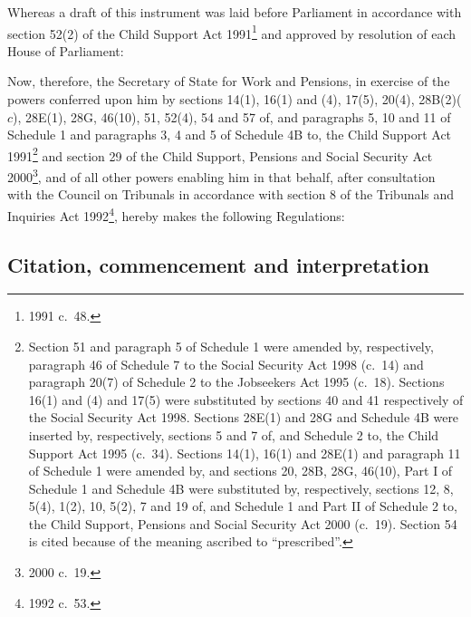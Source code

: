 \documentclass[12pt,a4paper]{article}
\title{\regstitle}
\author{S.I.\ 2002 No.\ 1204}
\date{Made
29th April 2002\\
Coming into force
in accordance with regulation 1(3)
}
\begin{document}
\maketitle

\noindent
Whereas a draft of this instrument was laid before Parliament in accordance with section 52(2) of the Child Support Act 1991\footnote{1991 c.\ 48.} and approved by resolution of each House of Parliament:

Now, therefore, the Secretary of State for Work and Pensions, in exercise of the powers conferred upon him by sections 14(1), 16(1) and (4), 17(5), 20(4), 28B(2)($c$), 28E(1), 28G, 46(10), 51, 52(4), 54 and 57 of, and paragraphs 5, 10 and 11 of Schedule 1 and paragraphs 3, 4 and 5 of Schedule 4B to, the Child Support Act 1991\footnote{Section 51 and paragraph 5 of Schedule 1 were amended by, respectively, paragraph 46 of Schedule 7 to the Social Security Act 1998 (c.\ 14) and paragraph 20(7) of Schedule 2 to the Jobseekers Act 1995 (c.\ 18). Sections 16(1) and (4) and 17(5) were substituted by sections 40 and 41 respectively of the Social Security Act 1998. Sections 28E(1) and 28G and Schedule 4B were inserted by, respectively, sections 5 and 7 of, and Schedule 2 to, the Child Support Act 1995 (c.\ 34). Sections 14(1), 16(1) and 28E(1) and paragraph 11 of Schedule 1 were amended by, and sections 20, 28B, 28G, 46(10), Part I of Schedule 1 and Schedule 4B were substituted by, respectively, sections 12, 8, 5(4), 1(2), 10, 5(2), 7 and 19 of, and Schedule 1 and Part II of Schedule 2 to, the Child Support, Pensions and Social Security Act 2000 (c.\ 19). Section 54 is cited because of the meaning ascribed to “prescribed”.} and section 29 of the Child Support, Pensions and Social Security Act 2000\footnote{2000 c.\ 19.}, and of all other powers enabling him in that behalf, after consultation with the Council on Tribunals in accordance with section 8 of the Tribunals and Inquiries Act 1992\footnote{1992 c.\ 53.}, hereby makes the following Regulations: 

\enlargethispage{-\baselineskip}

{\sloppy

\tableofcontents

}

\bigskip

\setcounter{secnumdepth}{-2}

\subsection[1. Citation, commencement and interpretation]{Citation, commencement and interpretation}
\end{document}
